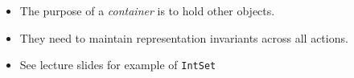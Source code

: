 \begin{itemize}
	\item The purpose of a \textit{container} is to hold other objects.
	\item They need to maintain representation invariants across all actions.
	\item See lecture slides for example of \lstinline[style=C++]{IntSet}
\end{itemize}